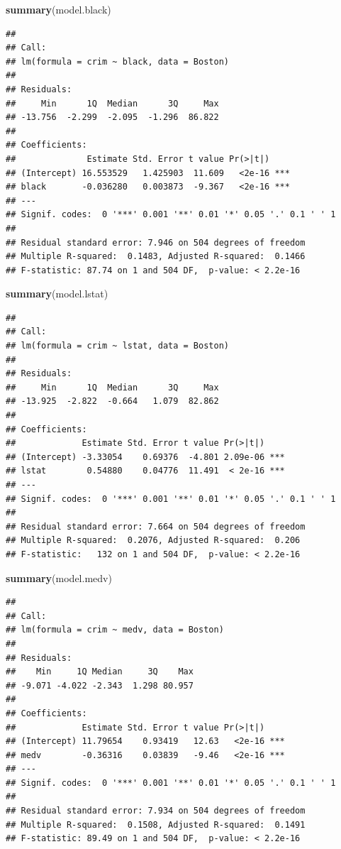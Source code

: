 \documentclass[]{article}
\newenvironment{Shaded}{\begin{snugshade}}{\end{snugshade}}
\newcommand{\KeywordTok}[1]{\textcolor[rgb]{0.13,0.29,0.53}{\textbf{#1}}}
\newcommand{\NormalTok}[1]{#1}
\begin{document}
\begin{Shaded}
\begin{Highlighting}[]
\KeywordTok{summary}\NormalTok{(model.black)}
\end{Highlighting}
\end{Shaded}

\begin{verbatim}
## 
## Call:
## lm(formula = crim ~ black, data = Boston)
## 
## Residuals:
##     Min      1Q  Median      3Q     Max 
## -13.756  -2.299  -2.095  -1.296  86.822 
## 
## Coefficients:
##              Estimate Std. Error t value Pr(>|t|)    
## (Intercept) 16.553529   1.425903  11.609   <2e-16 ***
## black       -0.036280   0.003873  -9.367   <2e-16 ***
## ---
## Signif. codes:  0 '***' 0.001 '**' 0.01 '*' 0.05 '.' 0.1 ' ' 1
## 
## Residual standard error: 7.946 on 504 degrees of freedom
## Multiple R-squared:  0.1483, Adjusted R-squared:  0.1466 
## F-statistic: 87.74 on 1 and 504 DF,  p-value: < 2.2e-16
\end{verbatim}

\begin{Shaded}
\begin{Highlighting}[]
\KeywordTok{summary}\NormalTok{(model.lstat)}
\end{Highlighting}
\end{Shaded}

\begin{verbatim}
## 
## Call:
## lm(formula = crim ~ lstat, data = Boston)
## 
## Residuals:
##     Min      1Q  Median      3Q     Max 
## -13.925  -2.822  -0.664   1.079  82.862 
## 
## Coefficients:
##             Estimate Std. Error t value Pr(>|t|)    
## (Intercept) -3.33054    0.69376  -4.801 2.09e-06 ***
## lstat        0.54880    0.04776  11.491  < 2e-16 ***
## ---
## Signif. codes:  0 '***' 0.001 '**' 0.01 '*' 0.05 '.' 0.1 ' ' 1
## 
## Residual standard error: 7.664 on 504 degrees of freedom
## Multiple R-squared:  0.2076, Adjusted R-squared:  0.206 
## F-statistic:   132 on 1 and 504 DF,  p-value: < 2.2e-16
\end{verbatim}

\begin{Shaded}
\begin{Highlighting}[]
\KeywordTok{summary}\NormalTok{(model.medv)}
\end{Highlighting}
\end{Shaded}

\begin{verbatim}
## 
## Call:
## lm(formula = crim ~ medv, data = Boston)
## 
## Residuals:
##    Min     1Q Median     3Q    Max 
## -9.071 -4.022 -2.343  1.298 80.957 
## 
## Coefficients:
##             Estimate Std. Error t value Pr(>|t|)    
## (Intercept) 11.79654    0.93419   12.63   <2e-16 ***
## medv        -0.36316    0.03839   -9.46   <2e-16 ***
## ---
## Signif. codes:  0 '***' 0.001 '**' 0.01 '*' 0.05 '.' 0.1 ' ' 1
## 
## Residual standard error: 7.934 on 504 degrees of freedom
## Multiple R-squared:  0.1508, Adjusted R-squared:  0.1491 
## F-statistic: 89.49 on 1 and 504 DF,  p-value: < 2.2e-16
\end{verbatim}
\end{document}
